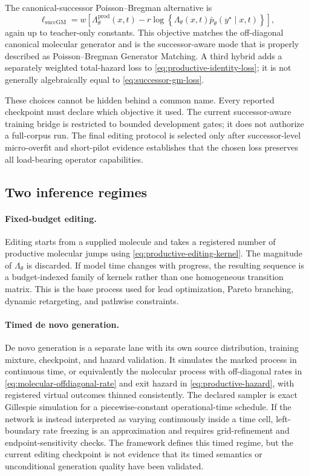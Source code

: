 \documentclass[10pt,letterpaper]{article}
\begin{document}
The canonical-successor Poisson--Bregman alternative is
\begin{equation}
  \ell_{\mathrm{succGM}}
  =
  w\left[
    \Lambda_\theta^{\mathrm{prod}}(x,t)
    -
    r\log\left\{
      \Lambda_\theta(x,t)
      \bar p_\theta(y^\star\mid x,t)
    \right\}
  \right],
  \label{eq:successor-gm-loss}
\end{equation}
again up to teacher-only constants. This objective matches the off-diagonal
canonical molecular generator and is the successor-aware mode that is
properly described as Poisson--Bregman Generator Matching. A third hybrid adds
a separately weighted total-hazard loss to
\eqref{eq:productive-identity-loss}; it is not generally algebraically equal
to \eqref{eq:successor-gm-loss}.

These choices cannot be hidden behind a common name. Every reported checkpoint
must declare which objective it used. The current successor-aware training
bridge is restricted to bounded development gates; it does not authorize a
full-corpus run. The final editing protocol is selected only after
successor-level micro-overfit and short-pilot evidence establishes that the
chosen loss preserves all load-bearing operator capabilities.

\subsection{Two inference regimes}
\label{sec:inference-regimes}

\paragraph{Fixed-budget editing.}
Editing starts from a supplied molecule and takes a registered number of
productive molecular jumps using
\eqref{eq:productive-editing-kernel}. The magnitude of
$\Lambda_\theta$ is discarded. If model time changes with progress, the
resulting sequence is a budget-indexed family of kernels rather than one
homogeneous transition matrix. This is the base process used for lead
optimization, Pareto branching, dynamic retargeting, and pathwise
constraints.

\paragraph{Timed de novo generation.}
De novo generation is a separate lane with its own source distribution,
training mixture, checkpoint, and hazard validation. It simulates the marked
process in continuous time, or equivalently the molecular process with
off-diagonal rates in \eqref{eq:molecular-offdiagonal-rate} and exit hazard in
\eqref{eq:productive-hazard}, with registered virtual outcomes thinned
consistently. The
declared sampler is exact Gillespie simulation for a piecewise-constant
operational-time schedule. If the network is instead interpreted as varying
continuously inside a time cell, left-boundary rate freezing is an
approximation and requires grid-refinement and endpoint-sensitivity checks.
The framework defines this timed regime, but the current editing checkpoint is
not evidence that its timed semantics or unconditional generation quality
have been validated.
\end{document}
